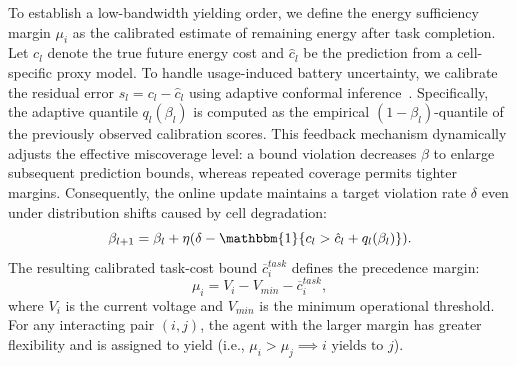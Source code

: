 To establish a low-bandwidth yielding order, we define the energy sufficiency margin $\mu_i$ as the calibrated estimate of remaining energy after task completion. 
Let $c_l$ denote the true future energy cost and $\hat{c}_l$ be the prediction from a cell-specific proxy model. 
To handle usage-induced battery uncertainty, we calibrate the residual error $s_l = c_l - \hat{c}_l$ using adaptive conformal inference~\cite{gibbs2021adaptive}. 
Specifically, the adaptive quantile $q_l(\beta_l)$ is computed as the empirical $(1-\beta_l)$-quantile of the previously observed calibration scores.
This feedback mechanism dynamically adjusts the effective miscoverage level: a bound violation decreases $\beta$ to enlarge subsequent prediction bounds, whereas repeated coverage permits tighter margins.
Consequently, the online update maintains a target violation rate $\delta$ even under distribution shifts caused by cell degradation:
\begin{equation}
    \beta_{l+1} = \beta_l + \eta(\delta - \mathbbm{1}\{c_l > \hat{c}_l + q_l(\beta_l)\}).
\end{equation}
The resulting calibrated task-cost bound $\overline{c}_i^{task}$ defines the precedence margin:
\begin{equation}
    \mu_i = V_i - V_{min} - \overline{c}_i^{task},
\end{equation}
where $V_i$ is the current voltage and $V_{min}$ is the minimum operational threshold. 
For any interacting pair $(i, j)$, the agent with the larger margin has greater flexibility and is assigned to yield (i.e., $\mu_i > \mu_j \implies i \text{ yields to } j$). 

